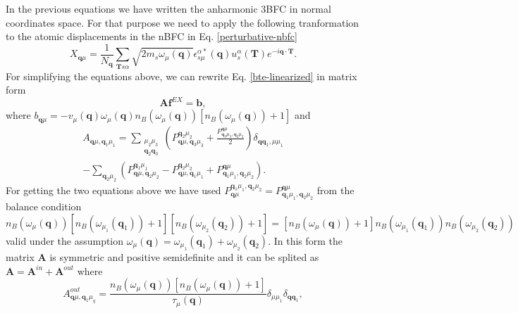 In the previous equations we have written the anharmonic 3BFC in normal coordinates space. For that purpose we need to apply the following tranformation to the atomic displacements in the nBFC 
in Eq. \ref{perturbative-nbfc}
\begin{equation}
 X_{\mathbf{q}\mu}=\frac{1}{N_{\mathbf{q}}}\sum_{\mathbf{T}s\alpha}\sqrt{2m_{s}\omega_{\mu}(\mathbf{q})}\epsilon_{s\mu}^{\alpha*}(\mathbf{q})u_{s}^{\alpha}(\mathbf{T})e^{-i\mathbf{q}\cdot\mathbf{T}}.
\end{equation}
For simplifying the equations above, we can rewrite Eq. \ref{bte-linearized} in matrix form
\begin{equation}
 \label{linear-equation}
 \mathbf{A}\mathbf{f}^{EX}=\mathbf{b},
\end{equation} 
where $b_{\mathbf{q}\mu}=-v_{\mu}(\mathbf{q})\omega_{\mu}(\mathbf{q})n_{B}(\omega_{\mu}(\mathbf{q}))[n_{B}(\omega_{\mu}(\mathbf{q}))+1]$ and 
\begin{multline}
 A_{\mathbf{q}\mu,\mathbf{q}_{1}\mu_{1}}=\sum\limits_{\substack{\mu_{2}\mu_{3} \\ \mathbf{q}_{2}\mathbf{q}_{3}}}\left(P_{\mathbf{q}\mu,\mathbf{q}_{3}\mu_{3}}^{\mathbf{q}_{2}\mu_{2}}+\frac{
 P_{\mathbf{q}_{3}\mu_{3},\mathbf{q}_{2}\mu_{2}}^{\mathbf{q}\mu}}{2}\right)\delta_{\mathbf{q}\mathbf{q}_{1},\mu\mu_{1}} \\ -\sum_{\mathbf{q}_{2}\mu_{2}}(P_{\mathbf{q}\mu,\mathbf{q}_{2}\mu_{2}}^{
 \mathbf{q}_{1}\mu_{1}}-P_{\mathbf{q}\mu,\mathbf{q}_{1}\mu_{1}}^{\mathbf{q}_{2}\mu_{2}}+P_{\mathbf{q}_{1}\mu_{1},\mathbf{q}_{2}\mu_{2}}^{\mathbf{q}\mu}).
\end{multline}
For getting the two equations above we have used $P_{\mathbf{q}\mu}^{\mathbf{q}_{1}\mu_{1},\mathbf{q}_{2}\mu_{2}}=P_{\mathbf{q}_{1}\mu_{1},\mathbf{q}_{2}\mu_{2}}^{\mathbf{q}\mu}$ from the balance 
condition $n_{B}(\omega_{\mu}(\mathbf{q}))[n_{B}(\omega_{\mu_{1}}(\mathbf{q}_{1}))+1][n_{B}(\omega_{\mu_{2}}(\mathbf{q}_{2}))+1]=[n_{B}(\omega_{\mu}(\mathbf{q}))+1]n_{B}(\omega_{\mu_{1}}(\mathbf{q}_{1}))n_{B}(
\omega_{\mu_{2}}(\mathbf{q}_{2}))$ valid under the assumption $\omega_{\mu}(\mathbf{q})=\omega_{\mu_{1}}(\mathbf{q}_{1})+\omega_{\mu_{2}}(\mathbf{q}_{2})$. In this form the matrix $\mathbf{A}$ is symmetric and 
positive semidefinite\cite{fugallo2013ab} and it can be splited as $\mathbf{A}=\mathbf{A}^{in}+\mathbf{A}^{out}$ where
\begin{equation}
 A_{\mathbf{q}\mu,\mathbf{q}_{1}\mu_{q}}^{out}=\frac{n_{B}(\omega_{\mu}(\mathbf{q}))[n_{B}(\omega_{\mu}(\mathbf{q}))+1]}{\tau_{\mu}(\mathbf{q})}\delta_{\mu\mu_{1}}\delta_{\mathbf{q}\mathbf{q}_{1}},
\end{equation}
